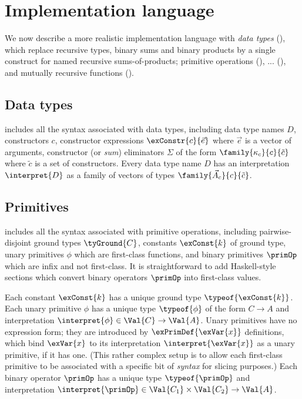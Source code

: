 \section{Implementation language}

We now describe a more realistic implementation language with \emph{data types}
(), which replace recursive types, binary
sums and binary products by a single construct for named recursive
sums-of-products; primitive operations
(), ...
(), and mutually recursive functions
().

\subsection{Data types}
\label{sec:impl-language:data-types}

 includes all the syntax associated with data
types, including data type names $D$, constructors $c$, constructor expressions
$\exConstr{c}{\vec{e}}$ where $\vec{e}$ is a vector of arguments, constructor
(or \emph{sum}) eliminators $\Sigma$ of the form $\family{\kappa_c}{c}{\tilde{c}}$
where $\tilde{c}$ is a set of constructors. Every data type name $D$ has an
interpretation $\interpret{D}$ as a family of vectors of types
$\family{\vec{A}_c}{c}{\tilde{c}}$.

\subsection{Primitives}
\label{sec:impl-language:primitives}




 includes all the syntax associated with primitive
operations, including pairwise-disjoint ground types $\tyGround{C}$, constants
$\exConst{k}$ of ground type, unary primitives $\phi$ which are first-class
functions, and binary primitives $\primOp$ which are infix and not first-class.
It is straightforward to add Haskell-style sections which convert binary
operators $\primOp$ into first-class values.

Each constant $\exConst{k}$ has a unique ground type $\typeof{\exConst{k}}$.
Each unary primitive $\phi$ has a unique type $\typeof{\phi}$ of the form $C \to
A$ and interpretation $\interpret{\phi} \in \Val{C} \to \Val{A}$. Unary
primitives have no expression form; they are introduced by
$\exPrimDef{\exVar{x}}$ definitions, which bind $\exVar{x}$ to its
interpretation $\interpret{\exVar{x}}$ as a unary primitive, if it has one.
(This rather complex setup is to allow each first-class primitive to be
associated with a specific bit of \emph{syntax} for slicing purposes.) Each
binary operator $\primOp$ has a unique type $\typeof{\primOp}$ and
interpretation $\interpret{\primOp} \in \Val{C_1} \times \Val{C_2} \to \Val{A}$.

